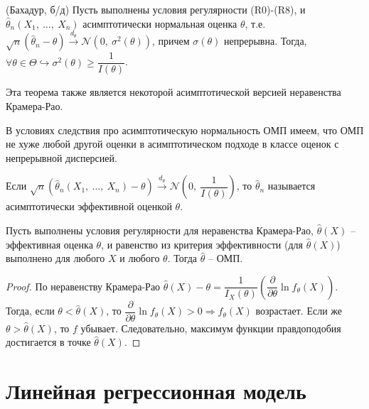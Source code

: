 \begin{theorem}
    (Бахадур, б/д) Пусть выполнены условия регулярности (R0)-(R8), и $\displaystyle \hat{\theta }_{n}( X_{1} ,\ \dotsc ,\ X_{n})$ асимптотически нормальная оценка $\displaystyle \theta $, т.е. $\displaystyle \sqrt{n}(\hat{\theta }_{n} -\theta )\xrightarrow{d_{\theta }}\mathcal{N}\left( 0,\ \sigma ^{2}( \theta )\right)$, причем $\displaystyle \sigma ( \theta )$ непрерывна. Тогда, $\displaystyle \forall \theta \in \Theta \hookrightarrow \sigma ^{2}( \theta ) \geqslant \dfrac{1}{I( \theta )}$.
\end{theorem}
\begin{note}
    Эта теорема также является некоторой асимптотической версией неравенства Крамера-Рао.
\end{note}
\begin{corollary}
    В условиях следствия про асимптотическую нормальность ОМП имеем, что ОМП не хуже любой другой оценки в асимптотическом подходе в классе оценок с непрерывной дисперсией.
\end{corollary}
\begin{definition}
    Если $\displaystyle \sqrt{n}(\hat{\theta }_{n}( X_{1} ,\ \dotsc ,\ X_{n}) -\theta )\xrightarrow{d_{\theta }}\mathcal{N}\left( 0,\ \dfrac{1}{I( \theta )}\right)$, то $\displaystyle \hat{\theta }_{n}$ называется асимптотически эффективной оценкой $\displaystyle \theta $.
\end{definition}
\begin{proposition}
    Пусть выполнены условия регулярности для неравенства Крамера-Рао, $\displaystyle \hat{\theta }( X)$ -- эффективная оценка $\displaystyle \theta $, и равенство из критерия эффективности (для $\displaystyle \hat{\theta }( X)$) выполнено для любого $\displaystyle X$ и любого $\displaystyle \theta $. Тогда $\displaystyle \hat{\theta }$ -- ОМП.
\end{proposition}
\begin{proof}
    По неравенству Крамера-Рао $\displaystyle \hat{\theta }( X) -\theta =\dfrac{1}{I_{X}( \theta )}\left(\dfrac{\partial }{\partial \theta }\ln f_{\theta }( X)\right)$. Тогда, если $\displaystyle \theta < \hat{\theta }( X)$, то $\displaystyle \dfrac{\partial }{\partial \theta }\ln f_{\theta }( X)  >0\Rightarrow f_{\theta }( X)$ возрастает. Если же $\displaystyle \theta  >\hat{\theta }( X)$, то $\displaystyle f$ убывает. Следовательно, максимум функции правдоподобия достигается в точке $\displaystyle \hat{\theta }( X)$.
\end{proof}
\section{Линейная регрессионная модель}

